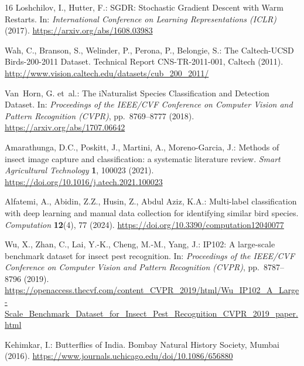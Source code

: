 \documentclass[runningheads]{llncs}
\begin{document}
\begin{thebibliography}{16}
Loshchilov, I., Hutter, F.: SGDR: Stochastic Gradient Descent with Warm Restarts. In: \emph{International Conference on Learning Representations (ICLR)} (2017). \url{https://arxiv.org/abs/1608.03983}

Wah, C., Branson, S., Welinder, P., Perona, P., Belongie, S.: The Caltech-UCSD Birds-200-2011 Dataset. Technical Report CNS-TR-2011-001, Caltech (2011). \url{http://www.vision.caltech.edu/datasets/cub_200_2011/}

Van~Horn, G. et~al.: The iNaturalist Species Classification and Detection Dataset. In: \emph{Proceedings of the IEEE/CVF Conference on Computer Vision and Pattern Recognition (CVPR)}, pp.~8769--8777 (2018). \url{https://arxiv.org/abs/1707.06642}

Amarathunga, D.C., Poskitt, J., Martini, A., Moreno-Garcia, J.: Methods of insect image capture and classification: a systematic literature review. \emph{Smart Agricultural Technology} \textbf{1}, 100023 (2021). \url{https://doi.org/10.1016/j.atech.2021.100023}

Alfatemi, A., Abidin, Z.Z., Husin, Z., Abdul Aziz, K.A.: Multi-label classification with deep learning and manual data collection for identifying similar bird species. \emph{Computation} \textbf{12}(4), 77 (2024). \url{https://doi.org/10.3390/computation12040077}

Wu, X., Zhan, C., Lai, Y.-K., Cheng, M.-M., Yang, J.: IP102: A large-scale benchmark dataset for insect pest recognition. In: \emph{Proceedings of the IEEE/CVF Conference on Computer Vision and Pattern Recognition (CVPR)}, pp.~8787--8796 (2019). \url{https://openaccess.thecvf.com/content_CVPR_2019/html/Wu_IP102_A_Large-Scale_Benchmark_Dataset_for_Insect_Pest_Recognition_CVPR_2019_paper.html}

Kehimkar, I.: Butterflies of India. Bombay Natural History Society, Mumbai (2016). \url{https://www.journals.uchicago.edu/doi/10.1086/656880}

\end{thebibliography}
\end{document}
